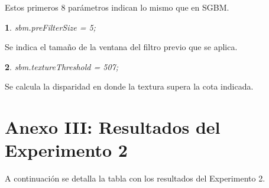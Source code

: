 \documentclass[11pt,a4paper,titlepage]{article}
\newtheorem{mytheorem}{}
\newenvironment{theorem}%
  {\begin{lrbox}{\thmbox}%
   \begin{minipage}{\dimexpr\linewidth-2\fboxsep}
   \begin{mytheorem}}%
  {\end{mytheorem}%
   \end{minipage}%
   \end{lrbox}%
   \begin{trivlist}
     \item[]\colorbox{lightgray}{\usebox\thmbox}
   \end{trivlist}}
\begin{document}
Estos primeros 8 parámetros indican lo mismo que en SGBM.

\begin{theorem}
sbm.preFilterSize = 5;
\end{theorem}

Se indica el tamaño de la ventana del filtro previo que se aplica.

\begin{theorem}
sbm.textureThreshold = 507;
\end{theorem}

Se calcula la disparidad en donde la textura supera la cota indicada.

\newpage

\section{Anexo III: Resultados del Experimento 2}

A continuación se detalla la tabla con los resultados del Experimento 2.

\end{document}

